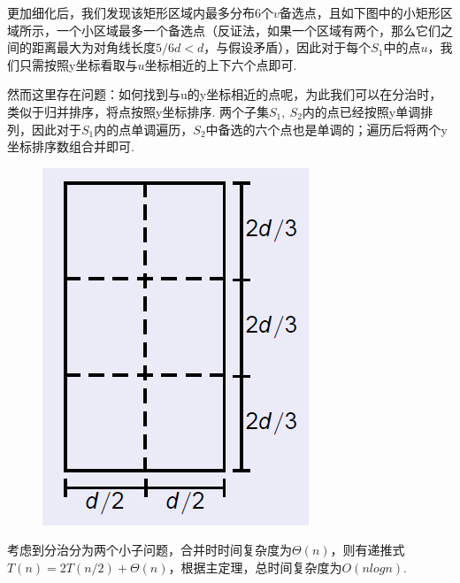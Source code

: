 \documentclass[UTF8]{ctexart}
\begin{document}
更加细化后，我们发现该矩形区域内最多分布6个$v$备选点，且如下图中的小矩形区域所示，一个小区域最多一个备选点（反证法，如果一个区域有两个，那么它们之间的距离最大为对角线长度$5/6d<d$，与假设矛盾），因此对于每个$S_1$中的点$u$，我们只需按照y坐标看取与$u$坐标相近的上下六个点即可.\par
然而这里存在问题：如何找到与u的y坐标相近的点呢，为此我们可以在分治时，类似于归并排序，将点按照y坐标排序. 两个子集$S_1,\ S_2$内的点已经按照y单调排列，因此对于$S_1$内的点单调遍历，$S_2$中备选的六个点也是单调的；遍历后将两个y坐标排序数组合并即可.
\begin{figure}[H]\begin{center}
	\includegraphics[scale = 0.5]{graph2.PNG}
\end{center}\end{figure}\par
考虑到分治分为两个小子问题，合并时时间复杂度为$\Theta(n)$，则有递推式$T(n)=2T(n/2)+\Theta(n)$，根据主定理，总时间复杂度为$O(nlogn)$.
\end{document}
